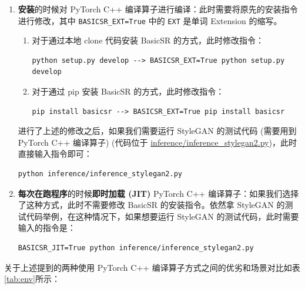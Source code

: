\documentclass[../main.tex]{subfiles}
\begin{document}
\begin{enumerate}
    \item \textbf{安装}的时候对 PyTorch C++ 编译算子进行编译：此时需要将原先的安装指令进行修改，其中 \texttt{BASICSR\_EXT=True} 中的 \texttt{EXT} 是单词 Extension 的缩写。
    \begin{enumerate}
        \item 对于通过本地 clone 代码安装 BasicSR 的方式，此时修改指令：
        \begin{verbatim}
python setup.py develop --> BASICSR_EXT=True python setup.py develop
        \end{verbatim}
        \item 对于通过 pip 安装 BasicSR 的方式，此时修改指令：
        \begin{verbatim}
pip install basicsr --> BASICSR_EXT=True pip install basicsr
        \end{verbatim}
    \end{enumerate}
    进行了上述的修改之后，如果我们需要运行 StyleGAN 的测试代码 (需要用到 PyTorch C++ 编译算子) (代码位于 \href{https://github.com/XPixelGroup/BasicSR/blob/master/inference/inference_stylegan2.py}{inference/inference\_stylegan2.py})，此时直接输入指令即可：
    \begin{verbatim}
python inference/inference_stylegan2.py
        \end{verbatim}

    \item \textbf{每次在跑程序}的时候\textbf{即时加载 (JIT)} PyTorch C++ 编译算子：如果我们选择了这种方式，此时不需要修改 BasicSR 的安装指令。依然拿 StyleGAN 的测试代码举例，在这种情况下，如果想要运行 StyleGAN 的测试代码，此时需要输入的指令是：
    \begin{verbatim}
BASICSR_JIT=True python inference/inference_stylegan2.py
    \end{verbatim}

\end{enumerate}

关于上述提到的两种使用 PyTorch C++ 编译算子方式之间的优劣和场景对比如表\ref{tab:env}所示：
\end{document}
